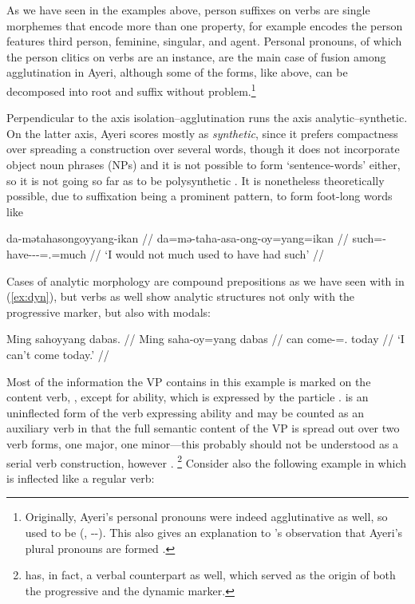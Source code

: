 As we have seen in the examples above, person suffixes on verbs are single 
morphemes that encode more than one property, for example  
encodes the person features third person, feminine, singular, and agent. 
Personal pronouns, of which the person clitics on 
verbs are an instance, are the main case of fusion among agglutination in 
Ayeri, although some of the forms, like  above, can 
be decomposed into root and suffix without problem.\footnote{Originally, 
Ayeri's personal pronouns were indeed agglutinative as well, so 
 used to be  (, 
\Tsg{}-\F{}-\Aarg{}). This also gives an explanation to \citet{boga2016}'s 
observation that Ayeri's plural pronouns are formed .}

Perpendicular to the axis isolation–agglutination runs the axis 
analytic–syn\-thetic. On the latter axis, Ayeri scores mostly as 
\emph{synthetic}, since it prefers compactness over spreading a construction 
over several words, though it does not incorporate object noun phrases (NPs) 
and it is not possible to form `sentence-words' either, so it is not going so 
far as to be poly\-syn\-thetic \citep[45--46]{comrie1989}. It is nonetheless 
theoretically possible, due to suffixation being a prominent pattern, to form 
foot-long words like

\ex\label{ex:footlong}\begingl
	\gla da-mətahasongoyyang-ikan //
	\glb da=mə-taha-asa-ong-oy=yang=ikan //
	\glc such=\Pst{}-have-\Hab{}-\Irr{}-\Neg{}=\Fsg{}.\Aarg{}=much //
	\glft `I would not much used to have had such' //
\endgl\xe

Cases of analytic morphology are compound prepositions as we have seen 
with  in (\ref{ex:dyn}), but verbs as well 
show analytic structures not only with the progressive marker, but also with 
modals:

\ex\begingl
	\gla Ming sahoyyang dabas. //
	\glb Ming saha-oy=yang dabas //
	\glc can come-\Neg{}=\Fsg{}.\Aarg{} today //
	\glft `I can't come today.' //
\endgl\xe

Most of the information the VP contains in this example is marked on the 
content verb, , except for ability, which is expressed 
by the particle .  is an uninflected 
form of the verb expressing ability and may be counted as an auxiliary verb in 
that the full semantic content of the VP is spread out over two verb forms, 
one major, one minor---this probably should not be understood as a 
serial verb construction, however \citep{aikhenvald2006}.%
\footnote{ has, in fact, a verbal 
counterpart  as well, which served as the 
origin of both the progressive and the dynamic marker.} Consider also the 
following example in which  is inflected like a regular verb:

